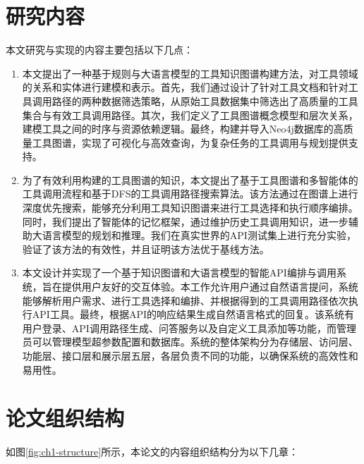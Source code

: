 \section{研究内容}

本文研究与实现的内容主要包括以下几点：

\begin{enumerate}
    \item 本文提出了一种基于规则与大语言模型的工具知识图谱构建方法，对工具领域的关系和实体进行建模和表示。首先，我们通过设计了针对工具文档和针对工具调用路径的两种数据筛选策略，从原始工具数据集中筛选出了高质量的工具集合与有效工具调用路径。其次，我们定义了工具图谱概念模型和层次关系，建模工具之间的时序与资源依赖逻辑。最终，构建并导入Neo4j数据库的高质量工具图谱，实现了可视化与高效查询，为复杂任务的工具调用与规划提供支持。
    \item 为了有效利用构建的工具图谱的知识，本文提出了基于工具图谱和多智能体的工具调用流程和基于DFS的工具调用路径搜索算法。该方法通过在图谱上进行深度优先搜索，能够充分利用工具知识图谱来进行工具选择和执行顺序编排。同时，我们提出了智能体的记忆框架，通过维护历史工具调用知识，进一步辅助大语言模型的规划和推理。我们在真实世界的API测试集上进行充分实验，验证了该方法的有效性，并且证明该方法优于基线方法。
    \item 本文设计并实现了一个基于知识图谱和大语言模型的智能API编排与调用系统，旨在提供用户友好的交互体验。本工作允许用户通过自然语言提问，系统能够解析用户需求、进行工具选择和编排、并根据得到的工具调用路径依次执行API工具。最终，根据API的响应结果生成自然语言格式的回复。该系统有用户登录、API调用路径生成、问答服务以及自定义工具添加等功能，而管理员可以管理模型超参数配置和数据库。系统的整体架构分为存储层、访问层、功能层、接口层和展示层五层，各层负责不同的功能，以确保系统的高效性和易用性。
\end{enumerate}

\section{论文组织结构}

如图\ref{fig:ch1-structure}所示，本论文的内容组织结构分为以下几章：

